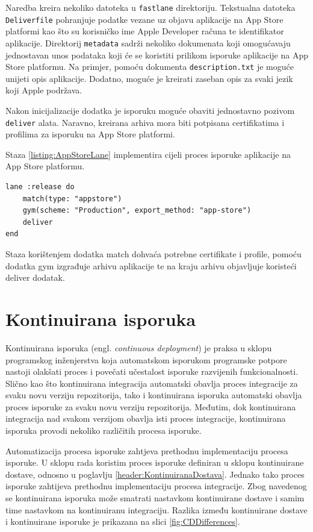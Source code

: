\documentclass[times, utf8, diplomski, numeric]{fer}
\newcommand{\eng}[1]{(engl. \textit{#1})}
\begin{document}
Naredba kreira nekoliko datoteka u \verb|fastlane| direktoriju. Tekstualna datoteka \verb|Deliverfile| pohranjuje podatke vezane uz objavu aplikacije na App Store platformi kao što su korisničko ime Apple Developer računa te identifikator aplikacije. Direktorij \verb|metadata| sadrži nekoliko dokumenata koji omogućavaju jednostavan unos podataka koji će se koristiti prilikom isporuke aplikacije na App Store platformu. Na primjer, pomoću dokumenta \verb|description.txt| je moguće unijeti opis aplikacije. Dodatno, moguće je kreirati zaseban opis za svaki jezik koji Apple podržava.

Nakon inicijalizacije dodatka je isporuku moguće obaviti jednostavno pozivom \verb|deliver| alata. Naravno, kreirana arhiva mora biti potpisana certifikatima i profilima za isporuku na App Store platformi.

Staza \ref{listing:AppStoreLane} implementira cijeli proces isporuke aplikacije na App Store platformu.

\begin{lstlisting}[caption=Isporuka na App Store platformu korištenjem dodatka deliver, label=listing:AppStoreLane]
lane :release do
    match(type: "appstore")
    gym(scheme: "Production", export_method: "app-store")
    deliver
end
\end{lstlisting}

Staza korištenjem dodatka match dohvaća potrebne certifikate i profile, pomoću dodatka gym izgrađuje arhivu aplikacije te na kraju arhivu objavljuje koristeći deliver dodatak.



\chapter{Kontinuirana isporuka} \label{header:KontinuiranaIsporuka}

Kontinuirana isporuka \eng{continuous deployment} je praksa u sklopu programskog inženjerstva koja automatskom isporukom programske potpore nastoji olakšati proces i povečati učestalost isporuke razvijenih funkcionalnosti. Slično kao što kontinuirana integracija automatski obavlja proces integracije za svaku novu verziju repozitorija, tako i kontinuirana isporuka automatski obavlja proces isporuke za svaku novu verziju repozitorija. Međutim, dok kontinuirana integracija nad svakom verzijom obavlja isti proces integracije, kontinuirana isporuka provodi nekoliko različitih procesa isporuke.

Automatizacija procesa isporuke zahtjeva prethodnu implementaciju procesa isporuke. U sklopu rada koristim proces isporuke definiran u sklopu kontinuirane dostave, odnosno u poglavlju \ref{header:KontinuiranaDostava}. Jednako tako proces isporuke zahtijeva prethodnu implementaciju procesa integracije. Zbog navedenog se kontinuirana isporuka može smatrati nastavkom kontinuirane dostave i samim time nastavkom na kontinuiranu integraciju. Razlika između kontinuirane dostave i kontinuirane isporuke je prikazana na slici \ref{fig:CDDifferences}\citep{cd:whats_the_diff}.
\end{document}
